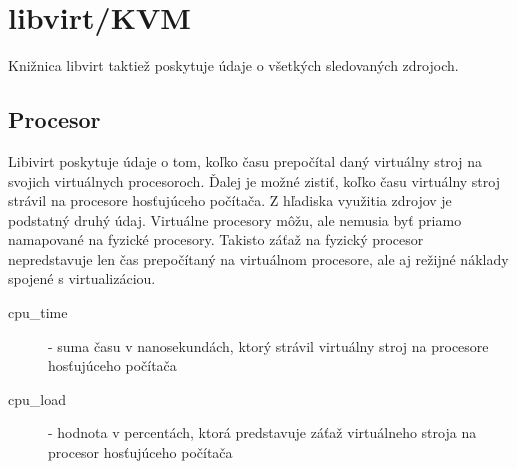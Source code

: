 \documentclass[12pt,twoside,color,cover,table]{fithesis3}
\begin{document}
\section{libvirt/KVM}
Knižnica libvirt taktiež poskytuje údaje o všetkých sledovaných zdrojoch.

\subsection{Procesor}
Libivirt poskytuje údaje o tom, koľko času prepočítal daný virtuálny stroj na svojich virtuálnych procesoroch. Ďalej je možné zistiť, koľko času virtuálny stroj strávil na procesore hosťujúceho počítača. 
Z hľadiska využitia zdrojov je podstatný druhý údaj. Virtuálne procesory môžu, ale nemusia byť priamo namapované na fyzické procesory. Takisto záťaž na fyzický procesor nepredstavuje len čas prepočítaný
na virtuálnom procesore, ale aj režijné náklady spojené s virtualizáciou.

\begin{description}
\item[cpu\_time] - suma času v nanosekundách, ktorý strávil virtuálny stroj na procesore hosťujúceho počítača %
\item[cpu\_load] - hodnota v percentách, ktorá predstavuje záťaž virtuálneho stroja na procesor hosťujúceho počítača
\end{description}
\end{document}
